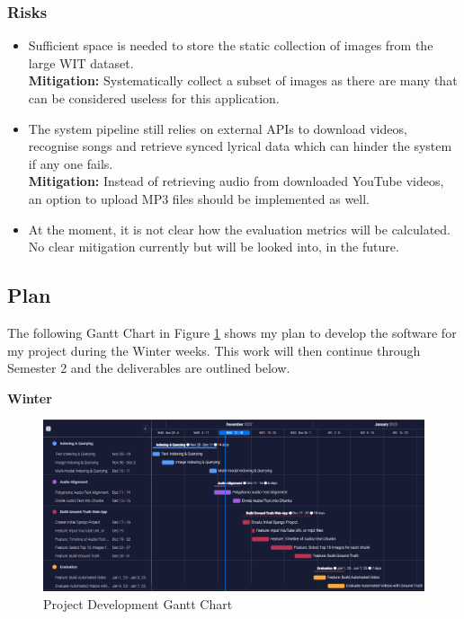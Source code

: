 \documentclass[11pt]{article}
\begin{document}
\subsubsection{Risks}\label{risks}
\begin{itemize}[noitemsep]
    \item Sufficient space is needed to store the static collection of images from the large WIT dataset. \\
    \textbf{Mitigation:} Systematically collect a subset of images as there are many that can be considered useless for this application.
    \item The system pipeline still relies on external APIs to download videos, recognise songs and retrieve synced lyrical data which can hinder the system if any one fails. \\
    \textbf{Mitigation:} Instead of retrieving audio from downloaded YouTube videos, an option to upload MP3 files should be implemented as well.
    \item At the moment, it is not clear how the evaluation metrics will be calculated. No clear mitigation currently but will be looked into, in the future.
\end{itemize}

\subsection{Plan}\label{plan}
The following Gantt Chart in Figure \ref{fig:gantt_chart} shows my plan to develop the software for my project during the Winter weeks. This work will then continue through Semester 2 and the deliverables are outlined below. 

\noindent \textbf{Winter}
\begin{figure}[h!]
    \centering
    \includegraphics[scale=0.34441]{project-gantt-chart.png}
    \caption{Project Development Gantt Chart}
    \label{fig:gantt_chart}
\end{figure}
\\
\end{document}
